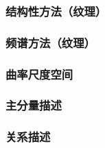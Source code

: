 \subsubsection{结构性方法（纹理）}

\subsubsection{频谱方法（纹理）}

\subsubsection{曲率尺度空间}

\subsubsection{主分量描述}

\subsubsection{关系描述}

\begin{comment}
\subsection{经典特征描述方法}

\subsubsection{SIFT特征}

\subsubsection{HOG特征}

\subsubsection{LBP特征}

\subsubsection{Shape Context}

\subsubsection{Fisher Vector}
\end{comment}

